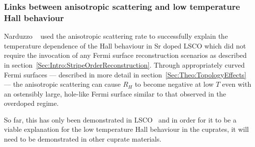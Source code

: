 
\subsubsection{Links between anisotropic scattering and low temperature Hall behaviour}

Narduzzo \etal~\cite{Narduzzo2008} used the anisotropic scattering rate to successfully explain the temperature dependence of the Hall behaviour in Sr doped \ac{LSCO} which did not require the invocation of any Fermi surface reconstruction scenarios as described in section~\ref{Sec:Intro:StripeOrderReconstruction}. Through appropriately curved Fermi surfaces --- described in more detail in section~\ref{Sec:Theo:TopologyEffects} --- the anisotropic scattering can cause $R_H$ to become negative at low $T$ even with an ostensibly large, hole-like Fermi surface similar to that observed in the overdoped regime.

So far, this has only been demonstrated in \ac{LSCO}~\cite{Narduzzo2008} and in order for it to be a viable explanation for the low temperature Hall behaviour in the cuprates, it will need to be demonstrated in other cuprate materials.





